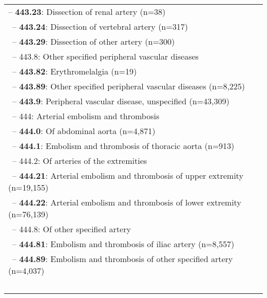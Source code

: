 \begin{longtable}{p{\textwidth}}
\hspace{40pt}\footnotesize{-- {\color{ForestGreen} \textbf{443.23}}: Dissection of renal artery (n=38)} \\ \-\ \hspace{40pt}\footnotesize{-- {\color{ForestGreen} \textbf{443.24}}: Dissection of vertebral artery (n=317)} \\ \-\ \hspace{40pt}\footnotesize{-- {\color{ForestGreen} \textbf{443.29}}: Dissection of other artery (n=300)} \\ \-\ \hspace{30pt}\footnotesize{-- 443.8: Other specified peripheral vascular diseases} \\ \-\ \hspace{40pt}\footnotesize{-- {\color{ForestGreen} \textbf{443.82}}: Erythromelalgia (n=19)} \\ \-\ \hspace{40pt}\footnotesize{-- {\color{ForestGreen} \textbf{443.89}}: Other specified peripheral vascular diseases (n=8,225)} \\ \-\ \hspace{30pt}\footnotesize{-- {\color{ForestGreen} \textbf{443.9}}: Peripheral vascular disease, unspecified (n=43,309)} \\ \-\ \hspace{20pt}\footnotesize{-- 444: Arterial embolism and thrombosis} \\ \-\ \hspace{30pt}\footnotesize{-- {\color{ForestGreen} \textbf{444.0}}: Of abdominal aorta (n=4,871)} \\ \-\ \hspace{30pt}\footnotesize{-- {\color{ForestGreen} \textbf{444.1}}: Embolism and thrombosis of thoracic aorta (n=913)} \\ \-\ \hspace{30pt}\footnotesize{-- 444.2: Of arteries of the extremities} \\ \-\ \hspace{40pt}\footnotesize{-- {\color{ForestGreen} \textbf{444.21}}: Arterial embolism and thrombosis of upper extremity (n=19,155)} \\ \-\ \hspace{40pt}\footnotesize{-- {\color{ForestGreen} \textbf{444.22}}: Arterial embolism and thrombosis of lower extremity (n=76,139)} \\ \-\ \hspace{30pt}\footnotesize{-- 444.8: Of other specified artery} \\ \-\ \hspace{40pt}\footnotesize{-- {\color{ForestGreen} \textbf{444.81}}: Embolism and thrombosis of iliac artery (n=8,557)} \\ \-\ \hspace{40pt}\footnotesize{-- {\color{ForestGreen} \textbf{444.89}}: Embolism and thrombosis of other specified artery (n=4,037)} \\ \-\ \hspace{30pt}\footnotesize{-- {\color{ForestGreen} \textbf{444.9}}: Embolism and thrombosis of 
\end{longtable}
